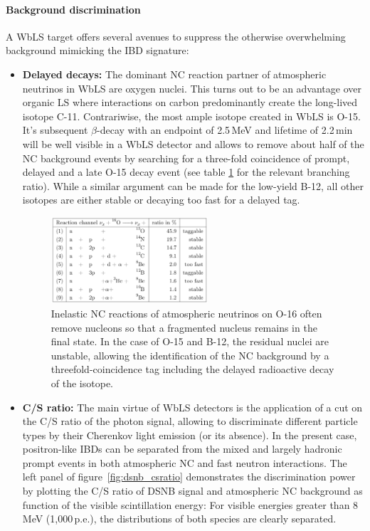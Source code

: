 \paragraph{Background discrimination} A WbLS target offers several avenues to suppress the otherwise overwhelming background mimicking the IBD signature:
\begin{itemize}
\item {\bf Delayed decays:} The dominant NC reaction partner of atmospheric neutrinos in WbLS are oxygen nuclei. This turns out to be an advantage over organic LS where interactions on carbon predominantly create the long-lived isotope C-11. Contrariwise, the most ample isotope created in WbLS is O-15. It's subsequent $\beta$-decay with an endpoint of 2.5\,MeV and lifetime of 2.2\,min will be well visible in a WbLS detector and allows to remove about half of the NC background events by searching for a three-fold coincidence of prompt, delayed and a late O-15 decay event (see table \ref{fig:dsnb_delayed_tagging} for the relevant branching ratio). While a similar argument can be made for the low-yield B-12, all other isotopes are either stable or decaying too fast for a delayed tag.
\begin{figure}[htp!]
\centering
\includegraphics[width=0.55\textwidth]{dsnb/dsnb_delayed_tagging}
\caption{Inelastic NC reactions of atmospheric neutrinos on O-16 often remove nucleons so that a fragmented nucleus remains in the final state. In the case of O-15 and B-12, the residual nuclei are unstable, allowing the identification of the NC background by a threefold-coincidence tag including the delayed radioactive decay of the isotope.}
\label{fig:dsnb_delayed_tagging}
\end{figure}
\item {\bf C/S ratio:} The main virtue of WbLS detectors is the application of a cut on the C/S ratio of the photon signal, allowing to discriminate different particle types by their Cherenkov light emission (or its absence). In the present case, positron-like IBDs can be separated from the mixed and largely hadronic prompt events in both atmospheric NC and fast neutron interactions. The left panel of figure~\ref{fig:dsnb_csratio} demonstrates the discrimination power by plotting the C/S ratio of DSNB signal and atmospheric NC background as function of the visible scintillation energy: For visible energies greater than 8\,MeV (1,000\,p.e.), the distributions of both species are clearly separated.


\end{itemize}
